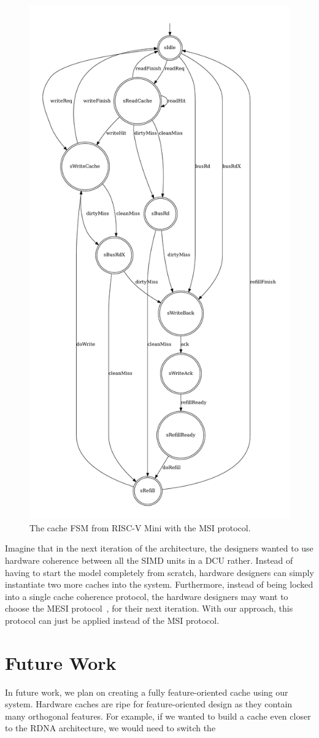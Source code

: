\documentclass[sigplan,anonymous,review]{acmart}
\begin{document}
\begin{figure}
    \centering
    \includegraphics[width=0.7\linewidth]{figures/cacheFSM2.pdf}
    \caption{The cache FSM from RISC-V Mini with the MSI protocol.}
    \label{fig:cacheAfter}
\end{figure}

Imagine that in the next iteration of the architecture, the designers wanted to use hardware coherence between all the SIMD units in a DCU rather. Instead of having to start the model completely from scratch, hardware designers can simply instantiate two more caches into the system. Furthermore, instead of being locked into a single cache coherence protocol, the hardware designers may want to choose the MESI protocol~\cite{}, for their next iteration. With our approach, this protocol can just be applied instead of the MSI protocol. 

\section{Future Work}
In future work, we plan on creating a fully feature-oriented cache using our system. Hardware caches are ripe for feature-oriented design as they contain many orthogonal features. For example, if we wanted to build a cache even closer to the RDNA architecture, we would need to switch the 
\end{document}
